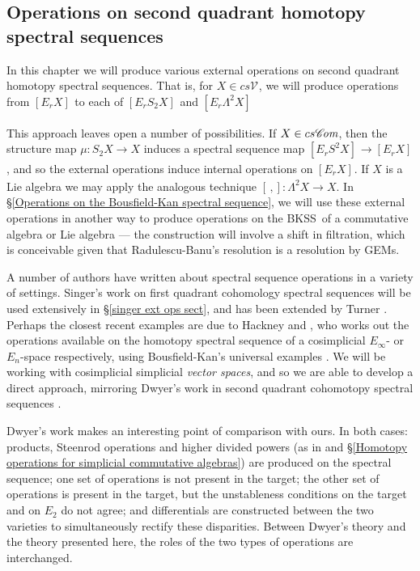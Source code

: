 \documentclass[11pt]{amsart} \renewcommand{\baselinestretch}{1.2}
\theoremstyle{plain}
\numberwithin{equation}{section} %
\theoremstyle{plain}
\numberwithin{equation}{chapter} %
\renewcommand{\to}{\longrightarrow}
\newcommand{\scrC}{\mathscr{C}}
\newcommand{\calV}{\mathcal{V}}
\newcommand{\vect}[2]{\calV^{#1}_{#2}}
\newcommand{\ExtCohOp}{\mathrm{Sq}_\mathrm{ext}}
\newcommand{\hExtCohOp}{\mathrm{Sq}_\mathrm{h,ext}}
\newcommand{\algs}{{\scrC\!\textit{\normalfont\textit{om}}}}
\newcommand{\E}[5]{[E^{#1}_{#2}#3]^{#4}_{#5}}
\newcommand{\uver}{^\mathrm{v}}
\newcommand{\dhor}{_\mathrm{h}}
\newcommand{\BKSS}{BKSS}
\newcommand{\SectionOrChapter}[1]{\section{\textbf{#1}}}
\begin{document}
\begin{second quadrant homotopy sseq operations}

\SectionOrChapter{Operations on second quadrant homotopy spectral sequences}
\label{second quadrant homotopy sseq operations}


In this chapter we will produce various external operations on second quadrant homotopy spectral sequences. That is, for $X\in cs\vect{}{}$, we will produce operations
from $\E{}{r}{X}{}{}$ to each of $\E{}{r}{S_2X}{}{}$ and $\E{}{r}{\Lambda^2 X}{}{}$

 This approach leaves open a number of possibilities. If $X\in cs\algs$, then the structure map $\mu:S_2X\to X$ induces a spectral sequence map $\E{}{r}{S^2X}{}{}\to \E{}{r}{X}{}{}$, and so the external operations induce internal operations on $\E{}{r}{X}{}{}$. If $X$ is a Lie algebra  we may apply the analogous technique $[\,,]:\Lambda^2X\to X$. 
In \S\ref{Operations on the Bousfield-Kan spectral sequence}, we will use these external operations in another way to produce operations on the \BKSS\ of a commutative algebra or Lie algebra --- the construction will involve a shift in filtration, which is conceivable given that  Radulescu-Banu's resolution  is a resolution by GEMs.




A number of authors have written about spectral sequence operations in a variety of settings. Singer's work \cite{MR2245560} on first quadrant cohomology spectral sequences will be used extensively in \S\ref{singer ext ops sect}, and has been extended by Turner \cite{turner_opns_and_sseqs_I.pdf}. 
 Perhaps the closest recent examples are due to Hackney \cite{MR3019742} and \cite{MR3171258}, who works out the operations available on the homotopy spectral sequence of a cosimplicial $E_\infty$- or $E_n$-space respectively, using Bousfield-Kan's universal examples \cite{BK_pairings.pdf}. We will be working with cosimplicial simplicial \emph{vector spaces}, and so we are able to develop a direct approach, mirroring Dwyer's work in second quadrant cohomotopy spectral sequences \cite{DwyerHigherDividedSquares.pdf}. 

Dwyer's work makes an interesting point of comparison with ours. In both cases: products, Steenrod operations and higher divided powers (as in \cite{DwyerHigherDividedSquares.pdf} and \S\ref{Homotopy operations for simplicial commutative algebras}) are produced on the spectral sequence; one set of operations is not present in the target;  the other set of operations is present in the target, but the unstableness conditions on the target and on $E_2$ do not agree; and differentials are constructed between the two varieties to simultaneously rectify these disparities. Between Dwyer's theory and the theory presented here, the roles of the two types of operations are interchanged.


\end{second quadrant homotopy sseq operations}
\end{document}
